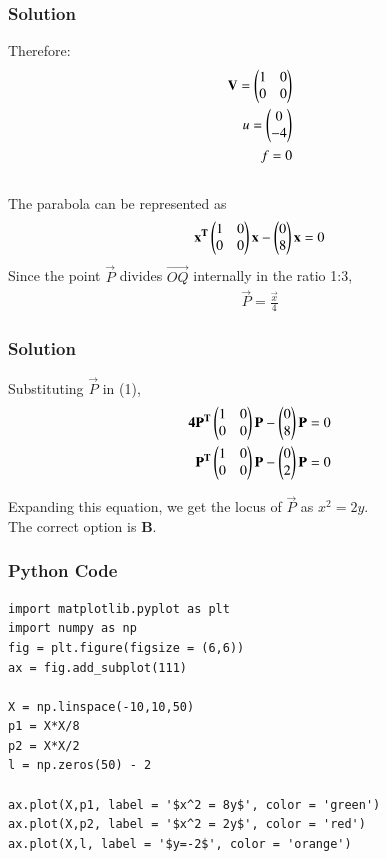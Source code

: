 \documentclass{beamer}
\begin{document}
\begin{frame}[fragile]
    \frametitle{Solution}
Therefore:
\begin{align*}
    \mathbf{V} = \begin{pmatrix} 1 & 0\\ 0 & 0\end{pmatrix}\\
    u = \begin{pmatrix}0\\-4\end{pmatrix}\\
    f = 0
\end{align*}\\
The parabola can be represented as \begin{align} \mathbf{x^T}\begin{pmatrix}1 & 0\\ 0 & 0\end{pmatrix}\mathbf{x} - \begin{pmatrix}0\\8\end{pmatrix}\mathbf{x} = 0\end{align}Since the point $\vec{P}$ divides $\vec{OQ}$ internally in the ratio 1:3, \begin{align}\vec{P} = \frac{\vec{x}}{4}\end{align}

\end{frame}
\begin{frame}[fragile]
\frametitle{Solution}
Substituting $\vec{P}$ in (1), 
\begin{align}
\mathbf{4P^T}\begin{pmatrix}1 & 0\\ 0 & 0\end{pmatrix}\mathbf{P} - \begin{pmatrix}0\\8\end{pmatrix}\mathbf{P} = 0\\
\mathbf{P^T}\begin{pmatrix}1 & 0\\ 0 & 0\end{pmatrix}\mathbf{P} - \begin{pmatrix}0\\2\end{pmatrix}\mathbf{P} = 0
\end{align}

Expanding this equation, we get the locus of $\vec{P}$ as $x^2 = 2y$. \\

The correct option is \textbf{B}.
\end{frame}

\begin{frame}[fragile]
    \frametitle{Python Code}
    \begin{lstlisting}
import matplotlib.pyplot as plt
import numpy as np
fig = plt.figure(figsize = (6,6))
ax = fig.add_subplot(111)

X = np.linspace(-10,10,50)
p1 = X*X/8
p2 = X*X/2
l = np.zeros(50) - 2

ax.plot(X,p1, label = '$x^2 = 8y$', color = 'green')
ax.plot(X,p2, label = '$x^2 = 2y$', color = 'red')
ax.plot(X,l, label = '$y=-2$', color = 'orange')
\end{lstlisting}
\end{frame}
\end{document}
